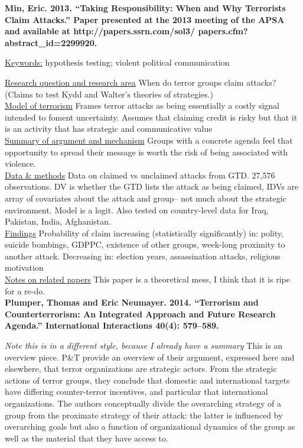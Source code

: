 \documentclass{article}[12pt]
\begin{document}
\textbf{Min, Eric. 2013. “Taking Responsibility: When and Why Terrorists Claim Attacks.” Paper presented at the 2013 meeting of the APSA and available at http://papers.ssrn.com/sol3/ papers.cfm?abstract\_id=2299920.}

\underline{Keywords:} hypothesis testing; violent political communication

\underline{Research question and research area} When do terror groups claim attacks? (Claims to test Kydd and Walter's theories of strategies.)\\
\underline{Model of terrorism} Frames terror attacks as being essentially a costly signal intended to foment uncertainty. Assumes that claiming credit is risky but that it is an activity that has strategic and communicative value\\
\underline{Summary of argument and mechanism} Groups with a concrete agenda feel that opportunity to spread their message is worth the risk of being associated with violence.\\
\underline{Data \& methods} Data on claimed vs unclaimed attacks from GTD. 27,576 observations. DV is whether the GTD lists the attack as being claimed, IDVs are array of covariates about the attack and group-- not much about the strategic environment. Model is a logit. Also tested on country-level data for Iraq, Pakistan, India, Afghanistan.\\
\underline{Findings} Probability of claim increasing (statistically significantly) in: polity, suicide bombings, GDPPC, existence of other groups, week-long proximity to another attack. Decreasing in: election years, assassination attacks, religious motivation\\
\underline{Notes on related papers} This paper is a theoretical mess, I think that it is ripe for a re-do.\\

\textbf{Plumper, Thomas and Eric Neumayer. 2014. “Terrorism and Counterterrorism: An Integrated Approach and Future Research Agenda.” International Interactions 40(4): 579–589.}

\textit{Note this is in a different style, because I already have a summary}
This is an overview piece.  P\&T provide an overview of their argument, expressed here and elsewhere, that terror organizations are strategic actors. From the strategic actions of terror groups, they conclude that domestic and international targets have differing counter-terror incentives, and particular that international  organizations. The authors conceptually divide the overarching strategy of a group from the proximate strategy of their attack: the latter is influenced by overarching goals but also a function of organizational dynamics of the group as well as the material that they have access to. 
\end{document}
